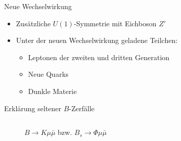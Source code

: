 \begin{frame}{Neue Wechselwirkung}
\begin{itemize}
	\setlength\itemsep{1em}
	\item Zusätzliche $U(1)$-Symmetrie mit Eichboson $Z'$
	\item Unter der neuen Wechselwirkung geladene Teilchen:
	\begin{itemize}
		\item Leptonen der zweiten und dritten Generation
		\item Neue Quarks
		\item Dunkle Materie
	\end{itemize}
\end{itemize}
\end{frame}



\begin{frame}{Erklärung seltener $B$-Zerfälle}
\vspace*{-.5cm}
\begin{columns}[c]
\begin{column}{.5\textwidth}
\begin{figure}
	\centering
	\resizebox{\textwidth}{!}{
	
	}
	\caption{$B\rightarrow K\mu\bar{\mu}$ bzw. $B_s\rightarrow \Phi\mu\bar{\mu}$}
\end{figure}
\end{column}
\begin{column}{.45\textwidth}
\end{column}
\end{columns}
\end{frame}


